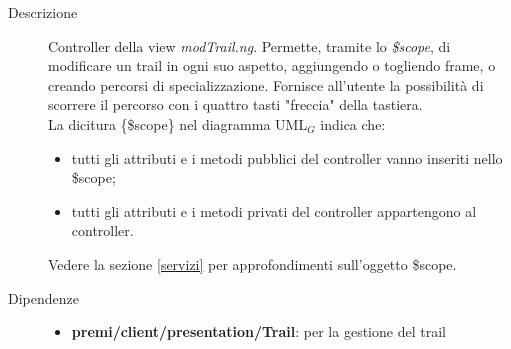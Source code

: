 \begin{description}
\item[Descrizione] \hfill
	Controller della view \textit{modTrail.ng}. Permette, tramite lo \textit{\$scope}, di modificare un trail in ogni suo aspetto, aggiungendo o togliendo frame, o creando percorsi di specializzazione. Fornisce all'utente la possibilità di scorrere il percorso con i quattro tasti "freccia" della tastiera.
	\\ La dicitura \{\$scope\} nel diagramma UML$_G$ indica che:
\begin{itemize}
\item tutti gli attributi e i metodi pubblici del controller vanno inseriti nello \$scope;
\item tutti gli attributi e i metodi privati del controller appartengono al controller.
\end{itemize}
Vedere la sezione \ref{servizi} per approfondimenti sull'oggetto \$scope.
	
	
\item[Dipendenze] \hfill
	\begin{itemize}
		\item \textbf{premi/client/presentation/Trail}: per la gestione del trail
	\end{itemize}
	

\end{description}
